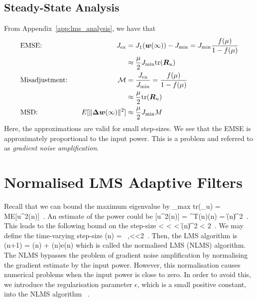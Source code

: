 \subsection{Steady-State Analysis}
From Appendix~\ref{app:lms_analysis}, we have that
\begin{alignat}{2}
  &\text{EMSE:}&\quad J_\textup{ex} &= J_1(\boldsymbol{w}(\infty))-J_\textup{min} = J_\textup{min}\frac{f(\mu)}{1-f(\mu)}\\
  & &\quad &\approx \frac{\mu}{2}J_\textup{min}\textup{tr}(\boldsymbol{R}_u)\\
  &\text{Misadjustment:}&\quad \mathcal{M} &= \frac{ J_\textup{ex}}{J_\textup{min}} = \frac{f(\mu)}{1-f(\mu)}\\
  & &\quad &\approx \frac{\mu}{2}\textup{tr}(\boldsymbol{R}_u)\\
  &\text{MSD:} &\quad E[\|\boldsymbol{\Delta}\boldsymbol{w}(\infty)\|^2] &\approx \frac{\mu}{2} J_\textup{min} M
\end{alignat}
Here, the approximations are valid for small step-sizes. We see that the EMSE is approximately proportional to the input power. This is a problem and referred to as \textit{gradient noise amplification}.

\section{Normalised LMS Adaptive Filters}
Recall that we can bound the maximum eigenvalue by
\bmath
  \lambda_\textup{max} \leq \textup{tr}(_u) = ME[u^2(n)]\ .
\emath
An estimate of the power could be
\bmath
  [u^2(n)] = ^T(n)(n) = \|(n)\|^2\ .
\emath
This leads to the following bound on the step-size
 < \mu < \quad\iff{} < \mu\|(n)\|^2 < 2\ .
\emath
We may define the time-varying step-size
\bmath
  \mu(n) = \ ,<\beta<2\ .
\emath
Then, the LMS algorithm is
\bmath
  (n+1) = (n) + (n)e(n)
\emath
which is called the normalised LMS (NLMS) algorithm. The NLMS bypasses the problem of gradient noise amplification by normalising the gradient estimate by the input power. However, this normalisation causes numerical problems when the input power is close to zero. In order to avoid this, we introduce the regularisation parameter $\epsilon$, which is a small positive constant, into the NLMS algorithm
\bmath
  \ .
\emath
